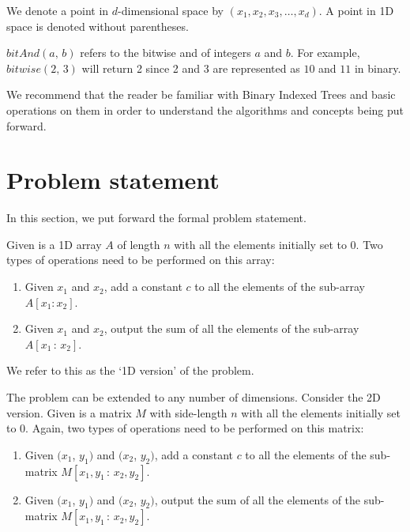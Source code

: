 \documentclass[a4paper]{article}
\begin{document}
\vspace{2mm}
We denote a point in $d$-dimensional space by $(x_1, x_2, x_3, \dots, x_d)$. A point in 1D space is denoted without parentheses.

\vspace{2 mm}
$bitAnd(a, \, b)$ refers to the bitwise and of integers $a$ and $b$. For example, $bitwise(2,\, 3)$ will return 2 since 2 and 3 are represented as $10$ and $11$ in binary.

\vspace{2 mm}
We recommend that the reader be familiar with Binary Indexed Trees and basic operations on them\cite{BIT} in order to understand the algorithms and concepts being put forward.



\section{Problem statement}
In this section, we put forward the formal problem statement.

\vspace{2 mm}
Given is a 1D array $A$ of length $n$ with all the elements initially set to 0. Two types of operations need to be performed on this array:

\begin{enumerate}
\item Given $x_1$ and $x_2$, add a constant $c$ to all the elements of the sub-array $A[x_1 : x_2]$.
\item Given $x_1$ and $x_2$, output the sum of all the elements of the sub-array $A[x_1\, :\, x_2]$.
\end{enumerate}
We refer to this as the `1D version' of the problem.

\vspace{2 mm}
The problem can be extended to any number of dimensions. Consider the 2D version. Given is a matrix $M$ with side-length $n$ with all the elements initially set to 0. Again, two types of operations need to be performed on this matrix:
\begin{enumerate}
\item Given $(x_1$, $y_1)$ and $(x_2$, $y_2)$, add a constant $c$ to all the elements of the sub-matrix $M[x_1, y_1\, : \,x_2, y_2]$.
\item Given $(x_1$, $y_1)$ and $(x_2$, $y_2)$, output the sum of all the elements of the sub-matrix $M[x_1, y_1 \,: \,x_2, y_2]$.
\end{enumerate}
\end{document}
